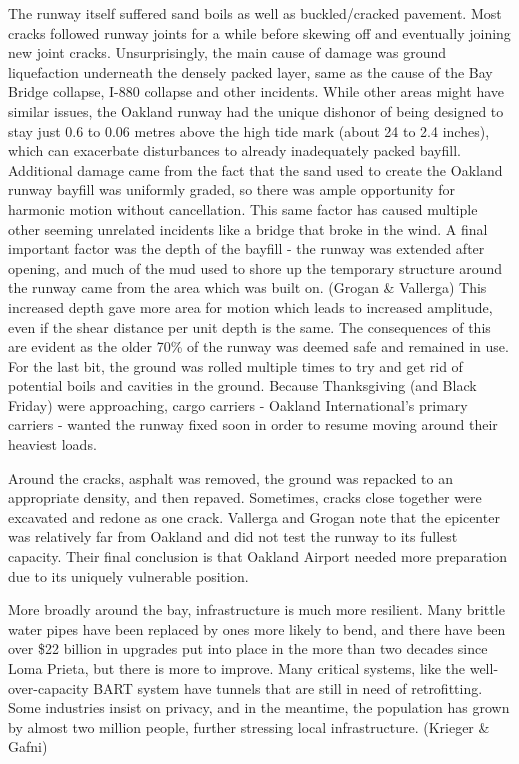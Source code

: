 \documentclass[12pt]{article}
\begin{document}
The runway itself suffered sand boils as well as buckled/cracked pavement.  Most cracks followed runway joints for a while before skewing off and eventually joining new joint cracks.  Unsurprisingly, the main cause of damage was ground liquefaction underneath the densely packed layer, same as the cause of the Bay Bridge collapse, I-880 collapse and other incidents.  While other areas might have similar issues, the Oakland runway had the unique dishonor of being designed to stay just 0.6 to 0.06 metres above the high tide mark (about 24 to 2.4 inches), which can exacerbate disturbances to already inadequately packed bayfill.  Additional damage came from the fact that the sand used to create the Oakland runway bayfill was uniformly graded, so there was ample opportunity for harmonic motion without cancellation.  This same factor has caused multiple other seeming unrelated incidents like a bridge that broke in the wind.  A final important factor was the depth of the bayfill - the runway was extended after opening, and much of the mud used to shore up the temporary structure around the runway came from the area which was built on.  (Grogan \& Vallerga)  This increased depth gave more area for motion which leads to increased amplitude, even if the shear distance per unit depth is the same.  The consequences of this are evident as the older 70\% of the runway was deemed safe and remained in use.  For the last bit, the ground was rolled multiple times to try and get rid of potential boils and cavities in the ground.  Because Thanksgiving (and Black Friday) were approaching, cargo carriers - Oakland International's primary carriers - wanted the runway fixed soon in order to resume moving around their heaviest loads.  

Around the cracks, asphalt was removed, the ground was repacked to an appropriate density, and then repaved.  Sometimes, cracks close together were excavated and redone as one crack.  Vallerga and Grogan note that the epicenter was relatively far from Oakland and did not test the runway to its fullest capacity.  Their final conclusion is that Oakland Airport needed more preparation due to its uniquely vulnerable position.

More broadly around the bay, infrastructure is much more resilient.  Many brittle water pipes have been replaced by ones more likely to bend, and there have been over \$22 billion in upgrades put into place in the more than two decades since Loma Prieta, but there is more to improve.  Many critical systems, like the well-over-capacity BART system have tunnels that are still in need of retrofitting.  Some industries insist on privacy, and in the meantime, the population has grown by almost two million people, further stressing local infrastructure. (Krieger \& Gafni)
\end{document}
